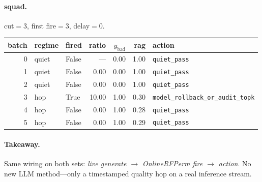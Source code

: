 \documentclass[11pt]{article}
\begin{document}
\paragraph{squad.} cut$=3$, first fire$=3$, delay$=0$.
\begin{center}\small
\begin{tabular}{rllrrrl}
\toprule batch & regime & fired & ratio & $y_{\mathrm{bad}}$ & rag & action \\ \midrule
0 & quiet & False & --- & 0.00 & 1.00 & \texttt{quiet\_pass} \\
1 & quiet & False & 0.00 & 0.00 & 1.00 & \texttt{quiet\_pass} \\
2 & quiet & False & 0.00 & 0.00 & 1.00 & \texttt{quiet\_pass} \\
3 & hop & True & 10.00 & 1.00 & 0.30 & \texttt{model\_rollback\_or\_audit\_topk} \\
4 & hop & False & 0.00 & 1.00 & 0.28 & \texttt{quiet\_pass} \\
5 & hop & False & 0.00 & 1.00 & 0.29 & \texttt{quiet\_pass} \\
\bottomrule\end{tabular}\end{center}

\paragraph{Takeaway.}
Same wiring on both sets: \emph{live generate $\to$ OnlineRFPerm fire $\to$ action}. No new LLM method---only a timestamped quality hop on a real inference stream.
\end{document}
